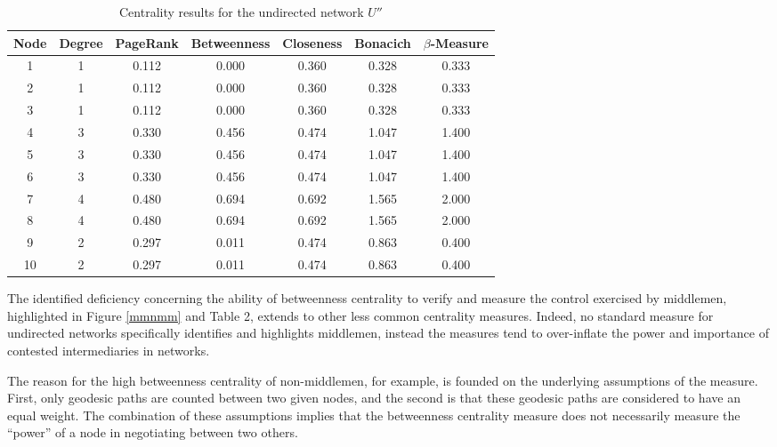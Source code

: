 \documentclass[11pt,fleqn]{article}
\begin{document}
\begin{table}[h]
\begin{center}
\begin{tabular}{|c|cccccc|}
\toprule
Node & Degree 	& PageRank	& Betweenness 	& Closeness 	& Bonacich 	& $\beta$-Measure \\
\midrule
1    & 1    	& 0.112 	& 0.000    		& 0.360  		& 0.328 	& 0.333\\
2    & 1    	& 0.112 	& 0.000    		& 0.360  		& 0.328 	& 0.333\\
3    & 1    	& 0.112 	& 0.000    		& 0.360  		& 0.328 	& 0.333\\
4    & 3    	& 0.330 	& 0.456    		& 0.474  		& 1.047 	& 1.400\\
5    & 3    	& 0.330 	& 0.456    		& 0.474  		& 1.047 	& 1.400\\
6    & 3    	& 0.330 	& 0.456    		& 0.474  		& 1.047 	& 1.400\\
7    & 4    	& 0.480 	& 0.694    		& 0.692  		& 1.565 	& 2.000\\
8    & 4    	& 0.480 	& 0.694    		& 0.692  		& 1.565 	& 2.000\\
9    & 2    	& 0.297 	& 0.011    		& 0.474  		& 0.863 	& 0.400\\
10   & 2    	& 0.297 	& 0.011    		& 0.474  		& 0.863 	& 0.400\\
\bottomrule
\end{tabular}
\caption{Centrality results for the undirected network $U''$}
\end{center}
\end{table}

\noindent
The identified deficiency concerning the ability of betweenness centrality to verify and measure the control exercised by middlemen, highlighted in Figure \ref{mmnmm} and Table 2, extends to other less common centrality measures. Indeed, no standard measure for undirected networks specifically identifies and highlights middlemen, instead the measures tend to over-inflate the power and importance of contested intermediaries in networks.

The reason for the high betweenness centrality of non-middlemen, for example, is founded on the underlying assumptions of the measure. First, only geodesic paths are counted between two given nodes, and the second is that these geodesic paths are considered to have an equal weight. The combination of these assumptions implies that the betweenness centrality measure does not necessarily measure the ``power'' of a node in negotiating between two others.
\end{document}
